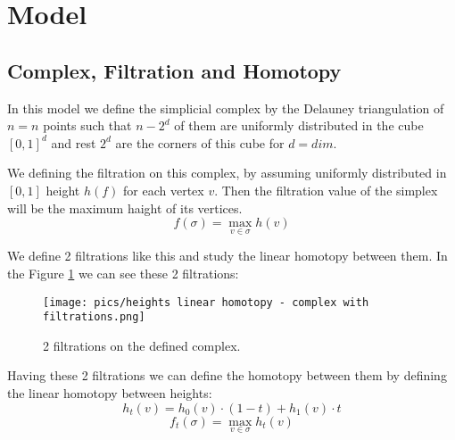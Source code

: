 \section{Model}
\subsection{Complex, Filtration and Homotopy}
\par In this model we define the simplicial complex by the Delauney triangulation of $n = {n}$ points such that $n - 2^d$ of them  are uniformly distributed in the cube $[0, 1]^d$ and rest $2^d$ are the corners of this cube for $d = {dim}$.
\par We defining the filtration on this complex, by assuming uniformly distributed in $[0, 1]$ height $h(f)$ for each vertex $v$. Then the filtration value of the simplex will be the maximum haight of its vertices.
$$
    f(\sigma) = \max_{v\in \sigma} h(v)
$$
\par We define 2 filtrations like this and study the linear homotopy between them. In the Figure \ref{fig:complex} we can see these 2 filtrations:
\begin{figure}[h!]
    \centering
    \texttt{[image: pics/heights linear homotopy - complex with filtrations.png]}
    \caption{2 filtrations on the defined complex.}
    \label{fig:complex}
\end{figure}

\par Having these 2 filtrations we can define the homotopy between them by defining the linear homotopy between heights:
$$
    h_t(v) = h_0(v)\cdot(1 - t) + h_1(v)\cdot t
$$
$$
    f_t(\sigma) = \max_{v\in \sigma} h_t(v)
$$

